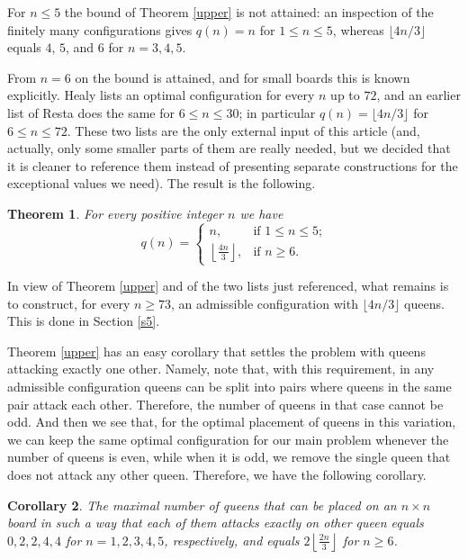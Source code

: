 \documentclass[10pt,a4paper]{article}
\newtheorem{theorem}{Theorem}[section]
\newtheorem{corollary}[theorem]{Corollary}
\theoremstyle{definition}
\begin{document}
For $n\leqslant5$ the bound of Theorem \ref{upper} is not attained: an
inspection of the finitely many configurations gives $q(n)=n$ for
$1\leqslant n\leqslant5$, whereas $\lfloor4n/3\rfloor$ equals $4$, $5$, and $6$
for $n=3,4,5$.

From $n=6$ on the bound is attained, and for small boards this is known
explicitly. Healy \cite{healy} lists an optimal configuration for every
$n$ up to $72$, and an earlier list of Resta \cite{resta} does the same for
$6\leqslant n\leqslant30$; in particular $q(n)=\lfloor4n/3\rfloor$ for
$6\leqslant n\leqslant72$. These two lists are the only external input of this
article (and, actually, only some smaller parts of them are really needed, but we decided that it is cleaner to reference them instead of presenting separate constructions for the exceptional values we need). The result is
the following.

\begin{theorem}
\label{main}
For every positive integer $n$ we have
\[
q(n)=
\left\{
\begin{array}{ll}
n,&\text{if $1\leqslant n\leqslant5$;}\\[1mm]
\left\lfloor\frac{4n}{3}\right\rfloor,&\text{if $n\geqslant6$.}
\end{array}\right.
\]
\end{theorem}

In view of Theorem \ref{upper} and of the two lists just referenced, what remains
is to construct, for every $n\geqslant73$, an admissible configuration with
$\lfloor4n/3\rfloor$ queens. This is done in Section \ref{s5}.

 Theorem \ref{upper} has an easy corollary that settles the problem with queens attacking exactly one other. Namely, note that, with this requirement, in any admissible configuration queens can be split into pairs where queens in the same pair attack each other. Therefore, the number of queens in that case cannot be odd. And then we see that, for the optimal placement of queens in this variation, we can keep the same optimal configuration for our main problem whenever the number of queens is even, while when it is odd, we remove the single queen that does not attack any other queen. Therefore, we have the following corollary.

 \begin{corollary}\label{exac}
     The maximal number of queens that can be placed on an $n\times n$ board in such a way that each of them attacks exactly on other queen equals $0,2,2,4,4$ for $n=1,2,3,4,5$, respectively, and equals $2\left\lfloor\frac{2n}{3}\right\rfloor$ for $n\geqslant 6$.
 \end{corollary}
\end{document}
